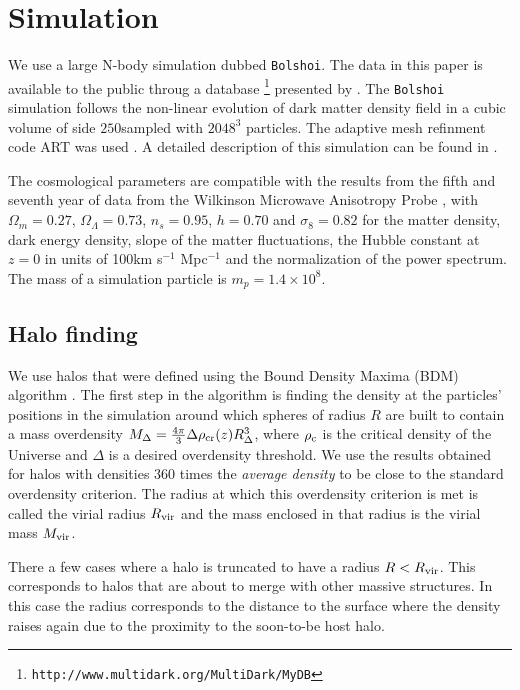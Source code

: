 

   
\section{Simulation}
\label{sec:simulation}


We use a large N-body simulation dubbed \verb"Bolshoi". The data in
this paper is available to the public throug a
database \footnote{\texttt{http://www.multidark.org/MultiDark/MyDB}}
presented by \cite{Riebe2013}. The \verb"Bolshoi" simulation follows 
the non-linear evolution of dark matter density field in a cubic
volume of side $250$\hMpc sampled with $2048^3$ particles. The 
adaptive mesh refinment code ART was used  \citep{Klypin09}. A detailed
description of this simulation can be found in \cite{Klypin:2010qw}.

The cosmological parameters are compatible with the results from the
fifth and seventh year of data from the Wilkinson Microwave Anisotropy
Probe \citep{Komatsu2009,Jarosik2011}, with $\Omega_m=0.27$,
$\Omega_{\Lambda}=0.73$, $n_{s}=0.95$, $h=0.70$ and $\sigma_8=0.82$
for the matter density, dark energy density, slope of the matter
fluctuations, the Hubble constant at $z=0$ in units of 100km s$^{-1}$
Mpc$^{-1}$ and the normalization of the power spectrum. The mass of a
simulation particle is $m_p = 1.4\times 10^{8}$\hMsun. 


\subsection{Halo finding}

We use halos that were defined using the Bound Density Maxima (BDM)
algorithm \citep{KlypinBDM}. The first step in the algorithm is
finding the density at the particles' positions in the simulation
around which spheres of radius $R$ are built to contain a mass
overdensity $M_{\Delta} = \frac{4\pi}{3}\Delta \rho_{\rm
  cr}(z)R_{\Delta}^{3}$, where $\rho_{\rm c}$ is the critical density of
the Universe and $\Delta$ is a desired overdensity threshold. We use
the results obtained for halos with densities $360$ times the
\emph{average density} to be close to the standard overdensity
criterion. The radius at which this overdensity criterion is met is
called the virial radius $R_{\rm vir}$ and the mass enclosed in that
radius is the virial mass $M_{\rm vir}$.

There a few cases where a halo is truncated to have a radius
$R<R_{\rm vir}$. This corresponds to halos that are about to merge with
other massive structures. In this case the radius corresponds to the
distance to the surface where the density raises again due to the
proximity to the soon-to-be host halo. 

